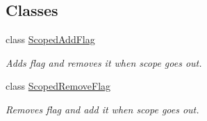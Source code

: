 \subsection*{Classes}
\begin{DoxyCompactItemize}
\item 
class \hyperlink{classel_1_1_loggers_1_1_scoped_add_flag}{Scoped\+Add\+Flag}
\begin{DoxyCompactList}\small\item\em Adds flag and removes it when scope goes out. \end{DoxyCompactList}\item 
class \hyperlink{classel_1_1_loggers_1_1_scoped_remove_flag}{Scoped\+Remove\+Flag}
\begin{DoxyCompactList}\small\item\em Removes flag and add it when scope goes out. \end{DoxyCompactList}\end{DoxyCompactItemize}
